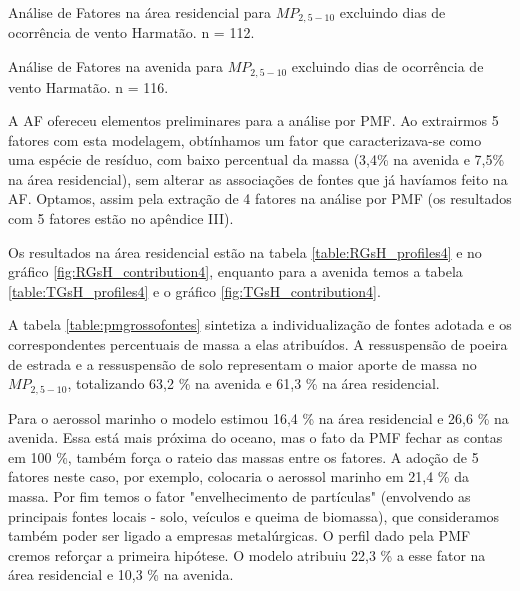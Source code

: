 \newpage
\begin{table}[H]
  \centering
  
  \caption{Análise de Fatores na área residencial para $MP_{2,5-10}$
           excluindo dias de ocorrência de vento Harmatão. n = 112.
          \label{table:AF_RGsH5}}
\end{table}

\begin{table}[H]
  \centering
  
  \caption{Análise de Fatores na avenida para $MP_{2,5-10}$
           excluindo dias de ocorrência de vento Harmatão. n = 116.
          \label{table:AF_TGsH5}}
\end{table}
\newpage

A AF ofereceu elementos preliminares para a análise por PMF. Ao extrairmos 
5 fatores com esta modelagem, obtínhamos um fator que caracterizava-se como uma 
espécie de resíduo, com baixo percentual da massa (3,4\% na avenida e 
7,5\% na área residencial), sem alterar as associações de fontes que já havíamos
feito na AF. Optamos, assim pela extração de 4 fatores na análise por PMF 
(os resultados com 5 fatores estão no apêndice III). 

Os resultados na área residencial estão na tabela \ref{table:RGsH_profiles4} e
no gráfico \ref{fig:RGsH_contribution4}, enquanto para a avenida temos a 
tabela \ref{table:TGsH_profiles4} e o gráfico \ref{fig:TGsH_contribution4}. 

A tabela \ref{table:pmgrossofontes} sintetiza a individualização de fontes 
adotada e os correspondentes percentuais de massa a elas atribuídos. 
A ressuspensão de poeira de estrada e a ressuspensão de solo representam o 
maior aporte de massa no $MP_{2,5-10}$, totalizando 63,2 \% na avenida e 61,3 \%
na área residencial. 

Para o aerossol marinho o modelo estimou 16,4 \% na 
área residencial e 26,6 \% na avenida. Essa está mais próxima do oceano, 
mas o fato da PMF fechar as contas em 100 \%, também força o rateio das massas 
entre os fatores. A adoção de 5 fatores neste caso, por exemplo, colocaria o 
aerossol marinho em 21,4 \% da massa. Por fim temos o fator "envelhecimento de 
partículas" (envolvendo as principais fontes locais - solo, veículos e queima 
de biomassa), que consideramos também poder ser ligado a empresas metalúrgicas. 
O perfil dado pela PMF cremos reforçar a primeira hipótese. O modelo atribuiu 
22,3 \% a esse fator na área residencial e 10,3 \% na avenida.%

